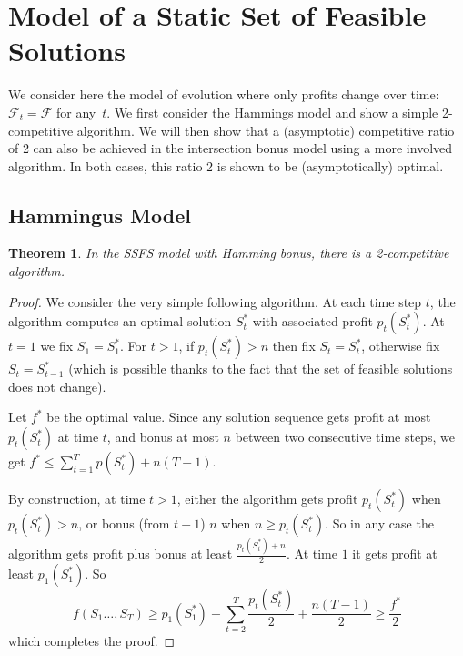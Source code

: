 \documentclass[a4paper]{book}
\newtheorem{theorem}{Theorem}[chapter]
\newtheorem{proof}{\noindent{\bf Proof.} }
\newcommand{\easy}[5]{Hamming}
\begin{document}
\section{Model of a Static Set of Feasible Solutions}\label{sec:static}

We consider here the model of evolution where only profits change over time: $\mathcal{F}_t=\mathcal{F}$ for any~$t$. 
We first consider the \easy{} bonus model and show a simple 2-competitive algorithm. We will then show that a (asymptotic) competitive ratio of 2 can also be achieved in the intersection bonus model using a more involved algorithm. In both cases, this ratio 2 is shown to be (asymptotically) optimal.  

\subsection{\easy{}-Bonus Model}
\label{subsec:static-hamming}

\begin{theorem}\label{thm:static-hamming-upper}
In the SSFS model with Hamming bonus, there is a 2-competitive algorithm. 
\end{theorem}

\begin{proof}
We consider the very simple following algorithm. At each time step $t$, the algorithm computes an optimal solution $S^*_t$ with associated profit $p_t(S^*_t)$. At $t=1$ we fix $S_1=S^*_1$. For $t>1$, if $p_t(S^*_t) > n$ then fix $S_t=S^*_t$, otherwise fix $S_t=S^*_{t-1}$ (which is possible thanks to the fact that the set of feasible solutions does not change).

Let $f^*$ be the optimal value. Since any solution sequence gets profit at most $p_t(S^*_t)$ at time $t$, and bonus at most $n$ between two consecutive time steps, we get $f^* \leq \sum_{t=1}^T p(S^*_t) + n(T-1)$. 

By construction, at time $t>1$, either the algorithm gets profit $p_t(S^*_t)$ when $p_t(S^*_t)>n$, or bonus (from $t-1$) $n$ when $n\geq p_t(S^*_t)$. So in any case the algorithm gets profit plus bonus at least $\frac{p_t(S^*_t)+n}{2}$. At time $1$ it gets profit at least $p_1(S^*_1)$. So 
\[f(S_1\dots,S_T)\geq p_1(S^*_1)+\sum_{t=2}^T \frac{p_t(S^*_t)}{2}+ \frac{n(T-1)}{2}\geq \frac{f^*}{2} \]
which completes the proof. %
\end{proof}
\end{document}
